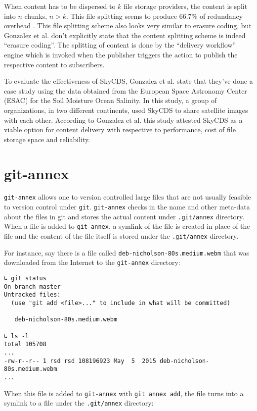 When content has to be dispersed to $k$ file storage providers, the
content is split into $n$ chunks, $n > k$. This file splitting seems
to produce 66.7\% of redundancy overhead \cite{skycds}. This file
splitting scheme also looks very similar to erasure coding, but Gonzalez et
al. don't explicitly state that the content splitting scheme is indeed
``erasure coding''. The splitting of content is done by the ``delivery
workflow'' engine which is invoked when the publisher triggers the
action to publish the respective content to subscribers.

To evaluate the effectiveness of SkyCDS, Gonzalez et al. state that
they've done a case study using the data obtained from the European
Space Astronomy Center (ESAC) for the Soil Moisture Ocean Salinity. In
this study, a group of organizations, in two different continents,
used SkyCDS to share satellite images with each other. According to
Gonzalez et al. this study attested SkyCDS as a viable option for
content delivery with respective to performance, cost of file storage
space and reliability.

\section{git-annex}\label{2-gitannex-sec}

\verb+git-annex+ allows one to version controlled large files that are
not usually feasible to version control under
\verb+git+\cite{program:git}. \verb+git-annex+ checks in the name
and other meta-data about the files in git and stores the actual
content under \verb+.git/annex+ directory. When a file is added to
\verb+git-annex+, a symlink of the file is created in place of the
file and the content of the file itself is stored under the
\verb+.git/annex+ directory.

For instance, say there is a file called
\verb+deb-nicholson-80s.medium.webm+ that was downloaded from the
Internet to the \verb+git-annex+ directory:

\begin{verbatim}
↳ git status
On branch master
Untracked files:
  (use "git add <file>..." to include in what will be committed)

   deb-nicholson-80s.medium.webm

↳ ls -l
total 105708
...
-rw-r--r-- 1 rsd rsd 108196923 May  5  2015 deb-nicholson-80s.medium.webm
...
\end{verbatim}

When this file is added to \verb+git-annex+ with \verb+git annex add+,
the file turns into a symlink to a file under the \verb+.git/annex+
directory:

